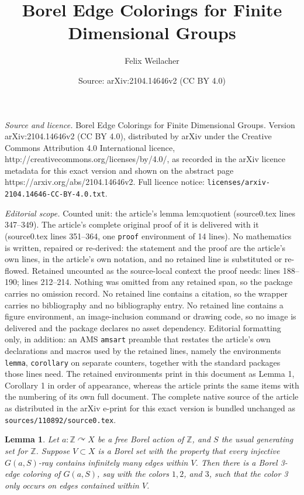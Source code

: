 \documentclass[10pt,a4paper]{amsart}
\title{Borel Edge Colorings for Finite Dimensional Groups}
\author{Felix Weilacher}
\date{Source: arXiv:2104.14646v2 (CC BY 4.0)}
\newtheorem{lemma}{Lemma}
\newcommand{\Z}{\mathbb{Z}}
\begin{document}
\maketitle

\noindent\emph{Source and licence.} Borel Edge Colorings for Finite Dimensional Groups. Version arXiv:2104.14646v2 (CC BY 4.0), distributed by arXiv under the Creative Commons Attribution 4.0 International licence, http://creativecommons.org/licenses/by/4.0/, as recorded in the arXiv licence metadata for this exact version and shown on the abstract page https://arxiv.org/abs/2104.14646v2. Full licence notice: \texttt{licenses/arxiv-2104.14646-CC-BY-4.0.txt}.\par\smallskip

\noindent\textit{Editorial scope.} Counted unit: the article's lemma lem:quotient (source0.tex lines 347--349). The article's complete original proof of it is delivered with it (source0.tex lines 351--364, one \texttt{proof} environment of 14 lines). No mathematics is written, repaired or re-derived: the statement and the proof are the article's own lines, in the article's own notation, and no retained line is substituted or re-flowed.  Retained uncounted as the source-local context the proof needs: lines 188--190; lines 212--214.  Nothing was omitted from any retained span, so the package carries no omission record.  No retained line contains a citation, so the wrapper carries no bibliography and no bibliography entry.  No retained line contains a figure environment, an image-inclusion command or drawing code, so no image is delivered and the package declares no asset dependency.  Editorial formatting only, in addition: an AMS \texttt{amsart} preamble that restates the article's own declarations and macros used by the retained lines, namely the environments \texttt{lemma}, \texttt{corollary} on separate counters, together with the standard packages those lines need.  The retained environments print in this document as Lemma 1, Corollary 1 in order of appearance, whereas the article prints the same items with the numbering of its own full document.  The complete native source of the article as distributed in the arXiv e-print for this exact version is bundled unchanged as \texttt{sources/110892/source0.tex}.
\begin{lemma}\label{lem:Z}
Let $a:\Z \curvearrowright X$ be a free Borel action of $\Z$, and $S$ the usual generating set for $\Z$. Suppose $V \subset X$ is a Borel set with the property that every injective $G(a,S)$-ray contains infinitely many edges within $V$. Then there is a Borel 3-edge coloring of $G(a,S)$, say with the colors $1,2$, and $3$, such that the color 3 only occurs on edges contained within $V$.
\end{lemma}
\end{document}

